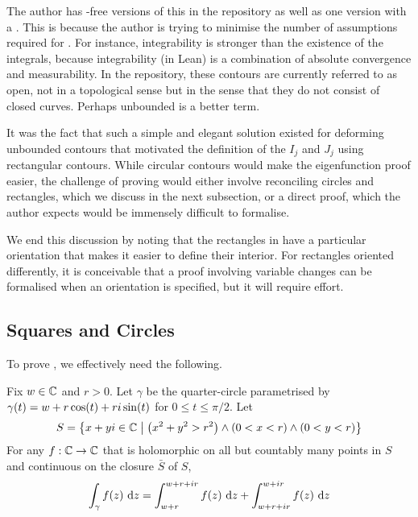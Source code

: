 The author has \sorry-free versions of this in the repository as well as one version with a \sorry. This is because the author is trying to minimise the number of assumptions required for . For instance, integrability is stronger than the existence of the integrals, because integrability (in Lean) is a combination of absolute convergence and measurability. In the repository, these contours are currently referred to as open, not in a topological sense but in the sense that they do not consist of closed curves. Perhaps unbounded is a better term.

It was the fact that such a simple and elegant solution existed for deforming unbounded contours that motivated the definition of the $I_j$ and $J_j$ using rectangular contours. While circular contours would make the eigenfunction proof easier, the challenge of proving  would either involve reconciling circles and rectangles, which we discuss in the next subsection, or a direct proof, which the author expects would be immensely difficult to formalise.

We end this discussion by noting that the rectangles in  have a particular orientation that makes it easier to define their interior. For rectangles oriented differently, it is conceivable that a proof involving variable changes can be formalised when an orientation is specified, but it will require effort.

\subsection{Squares and Circles}

To prove , we effectively need the following.

\begin{boxtheorem}\label{Ch5:Thm:CauchyGoursat_Circle_Rectangle}
    Fix $w \in \mathbb{C}$ and $r > 0$. Let $\gamma$ be the quarter-circle parametrised by $\gamma(t) = w + r\cos\!{\left( t \right)} + r i \sin\!{\left( t \right)}$ for $0 \leq t \leq \pi/2$. Let
    \begin{align*}
        S = \left\{ x + yi \in \mathbb{C} \; \middle\vert \; \left( x^2 + y^2 > r^2 \right) \land \left( 0 < x < r \right) \land \left( 0 < y < r \right) \right\}
    \end{align*}
    For any $f : \mathbb{C} \to \mathbb{C}$ that is holomorphic on all but countably many points in $S$ and continuous on the closure $\bar{S}$ of $S$,
    \begin{align*}
        \int_{\gamma} f(z) \, \operatorname{d}\!{z}
        = \int_{w + r}^{w + r + ir} f(z) \, \operatorname{d}\!{z} + \int_{w + r + ir}^{w + ir} f(z) \, \operatorname{d}\!{z}
    \end{align*}
\end{boxtheorem}

